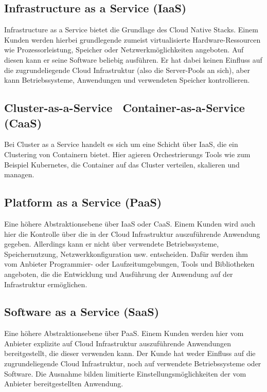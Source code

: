 \subsection{Infrastructure as a Service (IaaS)}
Infrastructure as a Service bietet die Grundlage des Cloud Native Stacks. Einem Kunden werden hierbei grundlegende zumeist virtualisierte Hardware-Ressourcen wie Prozessorleistung, Speicher oder Netzwerkmöglichkeiten angeboten. Auf diesen kann er seine Software beliebig ausführen. Er hat dabei keinen Einfluss auf die zugrundeliegende Cloud Infrastruktur (also die Server-Pools an sich), aber kann Betriebssysteme, Anwendungen und verwendeten Speicher kontrollieren\cite{mell_nist_2011}. \\

\subsection{Cluster-as-a-Service \ Container-as-a-Service (CaaS) }
Bei Cluster as a Service handelt es sich um eine Schicht über IaaS, die ein Clustering von Containern bietet. Hier agieren Orchestrierungs Tools wie zum Beispiel Kubernetes, die Container auf das Cluster verteilen, skalieren und managen\cite{kratzke_clouns_2016}. \\

\subsection{Platform as a Service (PaaS)}
Eine höhere Abstraktionsebene über IaaS oder CaaS. Einem Kunden wird auch hier die Kontrolle über die in der Cloud Infrastruktur auszuführende Anwendung gegeben. Allerdings kann er nicht über verwendete Betriebssysteme, Speichernutzung, Netzwerkkonfiguration usw. entscheiden. Dafür werden ihm vom Anbieter Programmier- oder Laufzeitumgebungen, Tools und Bibliotheken angeboten, die die Entwicklung und Ausführung der Anwendung auf der Infrastruktur ermöglichen\cite{mell_nist_2011}.\\

\subsection{Software as a Service (SaaS)}
Eine höhere Abstraktionsebene über PaaS. Einem Kunden werden hier vom Anbieter explizite auf Cloud Infrastruktur auszuführende Anwendungen bereitgestellt, die dieser verwenden kann. Der Kunde hat weder Einfluss auf die zugrundeliegende Cloud Infrastruktur, noch auf verwendete Betriebssysteme oder Software. Die Ausnahme bilden limitierte Einstellungsmöglichkeiten der vom Anbieter bereitgestellten Anwendung\cite{mell_nist_2011}.

